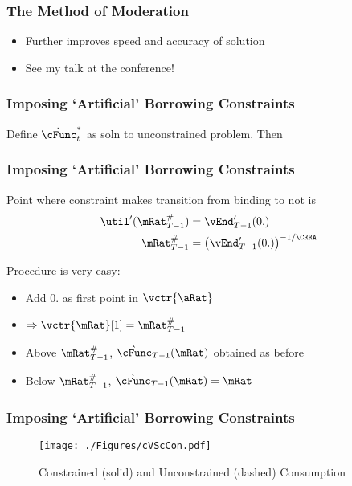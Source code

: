 \documentclass{beamer}
\begin{document}
\begin{frame}[label=MoM]
\frametitle{The Method of Moderation}

\begin{itemize}
\item Further improves speed and accuracy of solution
\item See my talk at the conference!
\end{itemize}

\end{frame}

\begin{frame}
\frametitle{Imposing `Artificial' Borrowing Constraints}


\pause 

Define $\grave{\cFunc}^{*}_{t}$ as soln to unconstrained problem.  Then


\end{frame}

\begin{frame}
\frametitle{Imposing `Artificial' Borrowing Constraints}

Point where constraint makes transition from binding to not is
\begin{equation*}\begin{gathered}\begin{aligned}
    \util^{\prime}(\mRat_{T-1}^{\#})  & = \vEnd^{\prime}_{T-1}(0.)
\\  \mRat_{T-1}^{\#}  & = \left(\vEnd^{\prime}_{T-1}(0.)\right)^{-1/\CRRA}
\end{aligned}\end{gathered}\end{equation*}
\pause\medskip

Procedure is very easy:
\begin{itemize}
\item Add $0.$ as first point in $\vctr{\aRat}$
\item $\Rightarrow \vctr{\mRat}[1] = \mRat_{T-1}^{\#}$
\item Above $\mRat_{T-1}^{\#}$, $\grave{\cFunc}_{T-1}(\mRat)$ obtained as before
\item Below $\mRat_{T-1}^{\#}$, $\grave{\cFunc}_{T-1}(\mRat)=\mRat$
\end{itemize}

\end{frame}

\begin{frame}
\frametitle{Imposing `Artificial' Borrowing Constraints}
\begin{figure}
\texttt{[image: ./Figures/cVScCon.pdf]}
        \caption{Constrained (solid) and Unconstrained (dashed) Consumption}
        \label{fig:cVScCon}
\end{figure}

\end{frame}
\end{document}
